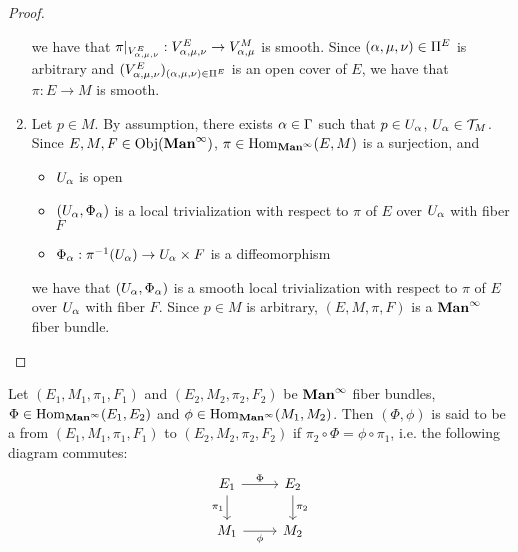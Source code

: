 \documentclass{book}
\begin{document}
\begin{proof}
\begin{enumerate}
\begin{itemize}
			\end{itemize}
			we have that $\pi|_{V^E_{\alpha, \mu, \nu}}: V^E_{\alpha, \mu, \nu} \rightarrow V^M_{\alpha, \mu}$ is smooth. Since $(\alpha, \mu, \nu) \in \Pi^E$ is arbitrary and $(V^E_{\alpha, \mu, \nu})_{(\alpha, \mu, \nu) \in \Pi^E }$ is an open cover of $E$, we have that $\pi:E \rightarrow M$ is smooth.
			\item Let $p \in M$. By assumption, there exists $\alpha \in \Gamma$ such that $p \in U_{\alpha}$, $U_{\alpha} \in \mathcal{T}_M$. Since $E,M,F \in \operatorname{Obj}(\operatorname*{\text{\textbf{Man}}^{\infty}})$, $\pi \in \operatorname{Hom}_{\operatorname*{\text{\textbf{Man}}^{\infty}}}(E,M)$ is a surjection, and 
			\begin{itemize}
				\item $U_{\alpha}$ is open
				\item $(U_{\alpha}, \Phi_{\alpha})$ is a local trivialization with respect to $\pi$ of $E$ over $U_{\alpha}$ with fiber $F$
				\item $\Phi_{\alpha}: \pi^{-1}(U_{\alpha}) \rightarrow U_{\alpha} \times F$ is a diffeomorphism
			\end{itemize}
			we have that $(U_{\alpha}, \Phi_{\alpha})$ is a smooth local trivialization with respect to $\pi$ of $E$ over $U_{\alpha}$ with fiber $F$. Since $p \in M$ is arbitrary, $(E, M, \pi, F)$ is a $\operatorname*{\text{\textbf{Man}}^{\infty}}$ fiber bundle.  
		\end{enumerate}
	\end{proof}

	\begin{defn}
		Let $(E_1, M_1, \pi_1, F_1)$ and $(E_2, M_2, \pi_2, F_2)$ be $\operatorname*{\text{\textbf{Man}}^{\infty}}$ fiber bundles, $\Phi \in \operatorname{Hom}_{\operatorname*{\text{\textbf{Man}}^{\infty}}}(E_1, E_2)$ and $\phi \in \operatorname{Hom}_{\operatorname*{\text{\textbf{Man}}^{\infty}}}(M_1, M_2)$. Then $(\Phi, \phi)$ is said to be a  from $(E_1, M_1, \pi_1, F_1)$ to $(E_2, M_2, \pi_2, F_2)$ if 
		$\pi_2 \circ \Phi = \phi \circ \pi_1$, 
		i.e. the following diagram commutes:
		\[ 
		\begin{tikzcd}
			E_1 \arrow[r, "\Phi"] \arrow[d, "\pi_1"'] & E_2  \arrow[d, "\pi_2"] \\
			M_1 \arrow[r, "\phi"']                  & M_2
		\end{tikzcd}
		\] 
	\end{defn}
	
\end{document}
